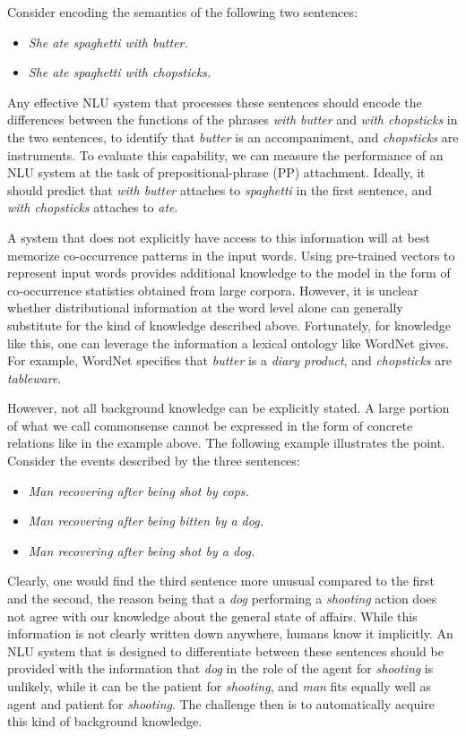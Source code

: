 Consider encoding the semantics of the following two sentences:
\begin{itemize}
	\item[] \textit{She ate spaghetti with butter.}
	\item[] \textit{She ate spaghetti with chopsticks.}
\end{itemize}
Any effective NLU system that processes these sentences should encode the
differences between the functions of the phrases \textit{with butter} and
\textit{with chopsticks} in the two sentences, to identify that \textit{butter}
is an accompaniment, and \textit{chopsticks} are instruments. To evaluate this
capability, we can measure the performance of an NLU system at the task of
prepositional-phrase (PP) attachment. Ideally, it should predict that
\textit{with butter} attaches to \textit{spaghetti} in the first sentence, and
\textit{with chopsticks} attaches to \textit{ate}.

A system that does not explicitly have access to this information will at best memorize
co-occurrence patterns in the input words.  Using pre-trained vectors to represent input words
provides additional knowledge to the model in the form of co-occurrence statistics obtained from
large corpora. However, it is unclear whether distributional information at the word level alone can
generally substitute for the kind of knowledge described above. Fortunately, for knowledge like
this, one can leverage the information a lexical ontology like WordNet \citep{miller1995wordnet}
gives. For example, WordNet specifies that \textit{butter} is a \textit{diary product}, and
\textit{chopsticks} are \textit{tableware}.

However, not all background knowledge can be explicitly stated. A large portion of what we call
commonsense cannot be expressed in the form of concrete relations like in the example above.  The
following example illustrates the point. Consider the events described by the three sentences:

\begin{itemize} \item[] \textit{Man recovering after being shot by cops.} \item[] \textit{Man
recovering after being bitten by a dog.} \item[] \textit{Man recovering after being shot by a dog.}
\end{itemize}

Clearly, one would find the third sentence more unusual compared to the first and the second, the
reason being that a \emph{dog} performing a \emph{shooting} action does not agree with our knowledge
about the general state of affairs. While this information is not clearly written down anywhere,
humans know it implicitly. An NLU system that is designed to differentiate between these sentences
should be provided with the information that \emph{dog} in the role of the agent for \emph{shooting}
is unlikely, while it can be the patient for \emph{shooting}, and \emph{man} fits equally well as
agent and patient for \emph{shooting}. The challenge then is to automatically acquire this kind of
background knowledge.

